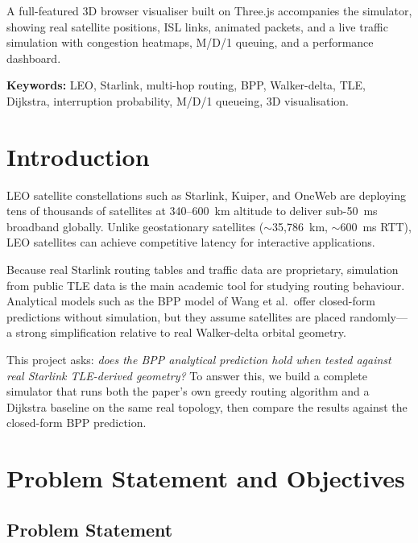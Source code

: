 \documentclass[12pt,a4paper]{report}
\begin{document}
A full-featured 3D browser visualiser built on Three.js accompanies the simulator,
showing real satellite positions, ISL links, animated packets, and a live traffic
simulation with congestion heatmaps, M/D/1 queuing, and a performance dashboard.

\textbf{Keywords:} LEO, Starlink, multi-hop routing, BPP, Walker-delta, TLE,
Dijkstra, interruption probability, M/D/1 queueing, 3D visualisation.

\tableofcontents

\chapter{Introduction}
\label{ch:intro}

LEO satellite constellations such as Starlink, Kuiper, and OneWeb are deploying tens
of thousands of satellites at 340--600~km altitude to deliver sub-50~ms broadband
globally. Unlike geostationary satellites ($\sim$35{,}786~km, $\sim$600~ms RTT), LEO
satellites can achieve competitive latency for interactive applications.

Because real Starlink routing tables and traffic data are proprietary, simulation from
public TLE data is the main academic tool for studying routing behaviour. Analytical
models such as the BPP model of Wang et al.\ offer closed-form predictions without
simulation, but they assume satellites are placed randomly---a strong simplification
relative to real Walker-delta orbital geometry.

This project asks: \textit{does the BPP analytical prediction hold when tested against
real Starlink TLE-derived geometry?} To answer this, we build a complete simulator that
runs both the paper's own greedy routing algorithm and a Dijkstra baseline on the same
real topology, then compare the results against the closed-form BPP prediction.

\chapter{Problem Statement and Objectives}
\label{ch:problem}

\section{Problem Statement}
\end{document}
